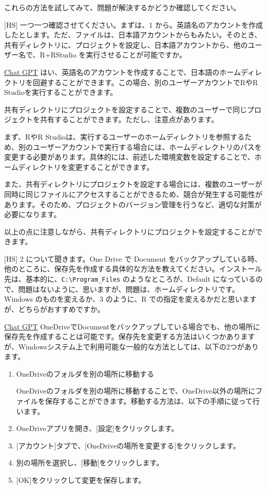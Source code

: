 \documentclass[
]{bxjsbook}
\theoremstyle{definition}
\theoremstyle{definition}
\theoremstyle{definition}
\theoremstyle{definition}
\theoremstyle{remark}
\begin{document}
これらの方法を試してみて、問題が解決するかどうか確認してください。

{[}HS{]} 一つ一つ確認させてください。まずは、1 から。英語名のアカウントを作成したとします。ただ、ファイルは、日本語アカウントからもみたい。そのとき、共有ディレクトリに、プロジェクトを設定し、日本語アカウントから、他のユーザー名で、R+RStudio を実行させることが可能ですか。

\protect\hyperlink{chatgpt}{Chat GPT} はい、英語名のアカウントを作成することで、日本語のホームディレクトリを回避することができます。この場合、別のユーザーアカウントでRやR Studioを実行することができます。

共有ディレクトリにプロジェクトを設定することで、複数のユーザーで同じプロジェクトを共有することができます。ただし、注意点があります。

まず、RやR Studioは、実行するユーザーのホームディレクトリを参照するため、別のユーザーアカウントで実行する場合には、ホームディレクトリのパスを変更する必要があります。具体的には、前述した環境変数を設定することで、ホームディレクトリを変更することができます。

また、共有ディレクトリにプロジェクトを設定する場合には、複数のユーザーが同時に同じファイルにアクセスすることができるため、競合が発生する可能性があります。そのため、プロジェクトのバージョン管理を行うなど、適切な対策が必要になります。

以上の点に注意しながら、共有ディレクトリにプロジェクトを設定することができます。

{[}HS{]} 2 について聞きます。One Drive で Document をバックアップしている時、他のところに、保存先を作成する具体的な方法を教えてください。インストール先は、基本的に、\texttt{C:\textbackslash{}Program\_Files} のようなところが、Default になっているので、問題はないように、思いますが、問題は、ホームディレクトリです。Windows のものを変えるか、3 のように、R での指定を変えるかだと思いますが、どちらがおすすめですか。

\protect\hyperlink{chatgpt}{Chat GPT} OneDriveでDocumentをバックアップしている場合でも、他の場所に保存先を作成することは可能です。保存先を変更する方法はいくつかありますが、Windowsシステム上で利用可能な一般的な方法としては、以下の2つがあります。

\begin{enumerate}
\def\labelenumi{\arabic{enumi}.}
\item
  OneDriveのフォルダを別の場所に移動する

  OneDriveのフォルダを別の場所に移動することで、OneDrive以外の場所にファイルを保存することができます。移動する方法は、以下の手順に従って行います。
\item
  OneDriveアプリを開き、{[}設定{]}をクリックします。
\item
  {[}アカウント{]}タブで、{[}OneDriveの場所を変更する{]}をクリックします。
\item
  別の場所を選択し、{[}移動{]}をクリックします。
\item
  {[}OK{]}をクリックして変更を保存します。
\end{enumerate}
\end{document}
